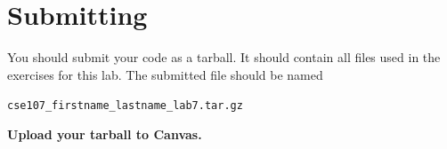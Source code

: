\documentclass[11pt]{cselabheader}
\begin{document}
\section{Submitting}

You should submit your code as a tarball. It should contain all files
used in the exercises for this lab. The submitted file should be named
\begin{center}
  \texttt{cse107\_firstname\_lastname\_lab7.tar.gz}
\end{center}

\begin{center}
  \textbf{Upload your tarball to Canvas.}
\end{center}

\listofexercises
\end{document}

